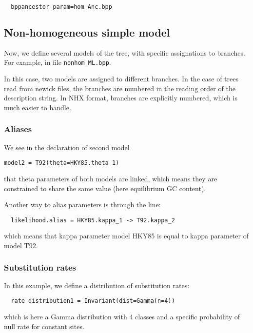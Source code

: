 \documentclass{article}
\begin{document}
\begin{verbatim}
  bppancestor param=hom_Anc.bpp
\end{verbatim}

\subsection{Non-homogeneous simple model}

Now, we define several models of the tree, with specific assignations
to branches. For example, in file \verb#nonhom_ML.bpp#.

In this case, two models are assigned to different branches. In the
case of trees read from newick files, the branches are numbered in the
reading order of the description string. In NHX format, branches are
explicitly numbered, which is much easier to handle.

\subsubsection*{Aliases}

We see in the declaration of second model

\begin{verbatim}
model2 = T92(theta=HKY85.theta_1)
\end{verbatim}

that theta parameters of both models are linked, which means they are
constrained to share the same value (here equilibrium GC content).

Another way to alias parameters is through the line:

\begin{verbatim}
  likelihood.alias = HKY85.kappa_1 -> T92.kappa_2
\end{verbatim}

which means that kappa parameter model HKY85 is equal to kappa
parameter of model T92.

\subsubsection*{Substitution rates}

In this example, we define a distribution of substitution rates:

\begin{verbatim}
  rate_distribution1 = Invariant(dist=Gamma(n=4))
\end{verbatim}

which is here a Gamma distribution with 4 classes and a specific
probability of null rate for constant sites.
\end{document}

